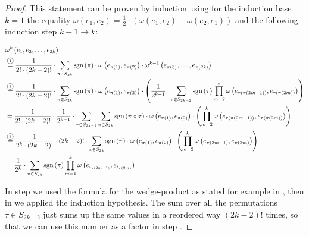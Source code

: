 \documentclass[../SymplecticSimplices.tex]{subfiles}
\begin{document}
\begin{proof}
  This statement can be proven by induction using for the induction base \( k = 1 \) the equality \( \omega \left( e_1, e_2 \right) = \frac{1}{2} \cdot \left( \omega \left( e_1, e_2 \right) - \omega \left( e_2, e_1 \right) \right) \) and the following induction step \( k-1 \rightarrow k \):

  \begin{align*}
    & \omega^k \left(e_{1}, e_{2}, \dots, e_{2k} \right) \\
    & \eqcom{1} \frac{1}{2! \cdot \left( 2k-2 \right)!} \cdot \sum\limits_{\pi \in S_{2k}} \textnormal{sgn} \left( \pi \right) \cdot \omega\left(e_{\pi \left( 1 \right)}, e_{\pi \left( 2 \right)}\right) \cdot \omega^{k-1}\left(e_{\pi \left( 3 \right)}, \dots, e_{\pi \left( 2k \right)} \right) \\
    & \eqcom{2} \frac{1}{2! \cdot \left( 2k-2 \right)!} \cdot \sum\limits_{\pi \in S_{2k}} \textnormal{sgn} \left( \pi \right) \cdot \omega\left(e_{\pi \left( 1 \right)}, e_{\pi \left( 2 \right)} \right) \cdot \left( \frac{1}{2^{k-1}} \cdot \sum \limits_{\tau \in S_{2k-2}} \textnormal{sgn} \left( \tau \right) \prod \limits_{m = 2}^{k} \omega\left(e_{\tau \left( \pi \left( 2m-1 \right) \right)}, e_{\tau \left( \pi \left( 2m \right) \right)} \right) \right) \\
    & = \frac{1}{2! \cdot \left( 2k-2 \right)!} \cdot \frac{1}{2^{k-1}} \cdot \sum \limits_{\tau \in S_{2k-2}} \sum\limits_{\pi \in S_{2k}} \textnormal{sgn} \left( \pi \circ \tau \right) \cdot \omega\left(e_{\pi \left( 1 \right)}, e_{\pi \left( 2 \right)} \right) \cdot \left( \prod \limits_{m = 2}^{k} \omega\left(e_{\tau \left( \pi \left( 2m-1 \right) \right)}, e_{\tau \left( \pi \left( 2m \right) \right)} \right) \right) \\
    & \eqcom{3} \frac{1}{2^k \cdot \left( 2k-2 \right)!} \cdot \left( 2k-2 \right)! \cdot \sum\limits_{\pi \in S_{2k}} \textnormal{sgn} \left( \pi \right) \cdot \omega\left(e_{\pi \left( 1 \right)}, e_{\pi \left( 2 \right)} \right) \cdot \left( \prod \limits_{m = 2}^{k} \omega\left(e_{\pi \left( 2m-1 \right)}, e_{\pi \left( 2m \right)} \right) \right) \\
    & = \frac{1}{2^k} \cdot \sum\limits_{\pi \in S_{2k}} \textnormal{sgn} \left( \pi \right) \prod \limits_{m = 1}^{k} \omega\left(e_{i_{\pi \left( 2m-1 \right)}}, e_{i_{\pi \left( 2m \right)}} \right)
  \end{align*}

  In step  we used the formula for the wedge-product as stated for example in \cite[Section 8.1]{jaenich}, then in  we applied the induction hypothesis. The sum over all the permutations \( \tau \in S_{2k-2} \) just sums up the same values in a reordered way \( \left( 2k - 2 \right)! \) times, so that we can use this number as a factor in step .
\end{proof}
\end{document}
